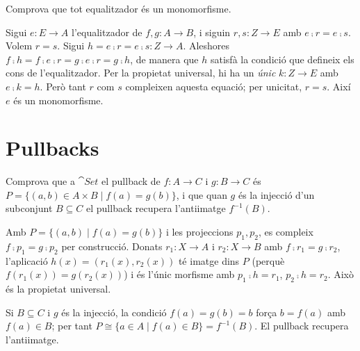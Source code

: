 \begin{exercici}
Comprova que tot equalitzador és un monomorfisme.
\end{exercici}

\begin{solucio}
Sigui $e\colon E\to A$ l'equalitzador de $f,g\colon A\to B$, i siguin $r,s\colon Z\to E$ amb $e\comp r=e\comp s$. Volem $r=s$. Sigui $h=e\comp r=e\comp s\colon Z\to A$. Aleshores $f\comp h=f\comp e\comp r=g\comp e\comp r=g\comp h$, de manera que $h$ satisfà la condició que defineix els cons de l'equalitzador. Per la propietat universal, hi ha un \emph{únic} $k\colon Z\to E$ amb $e\comp k=h$. Però tant $r$ com $s$ compleixen aquesta equació; per unicitat, $r=s$. Així $e$ és un monomorfisme.
\end{solucio}

\section{Pullbacks}

\begin{exercici}
Comprova que a $\cat{Set}$ el pullback de $f\colon A\to C$ i $g\colon B\to C$ és $P=\{(a,b)\in A\times B\mid f(a)=g(b)\}$, i que quan $g$ és la injecció d'un subconjunt $B\subseteq C$ el pullback recupera l'antiimatge $f^{-1}(B)$.
\end{exercici}

\begin{solucio}
Amb $P=\{(a,b)\mid f(a)=g(b)\}$ i les projeccions $p_1,p_2$, es compleix $f\comp p_1=g\comp p_2$ per construcció. Donats $r_1\colon X\to A$ i $r_2\colon X\to B$ amb $f\comp r_1=g\comp r_2$, l'aplicació $h(x)=(r_1(x),r_2(x))$ té imatge dins $P$ (perquè $f(r_1(x))=g(r_2(x))$) i és l'únic morfisme amb $p_1\comp h=r_1$, $p_2\comp h=r_2$. Això és la propietat universal.

Si $B\subseteq C$ i $g$ és la injecció, la condició $f(a)=g(b)=b$ força $b=f(a)$ amb $f(a)\in B$; per tant $P\cong\{a\in A\mid f(a)\in B\}=f^{-1}(B)$. El pullback recupera l'antiimatge.
\end{solucio}

